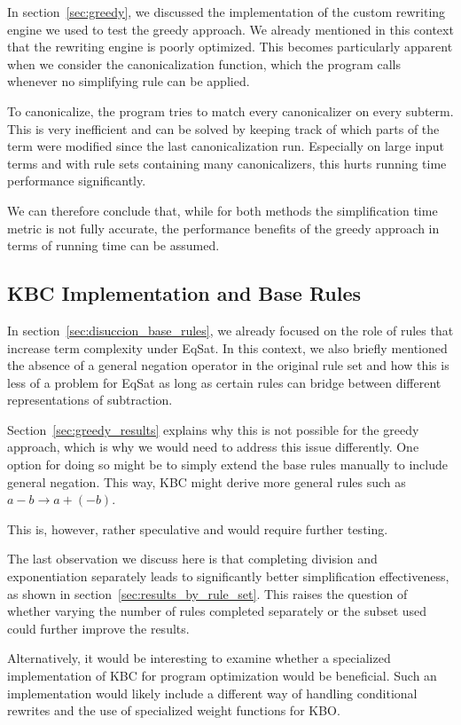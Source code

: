 In section~\ref{sec:greedy}, we discussed the implementation of the custom rewriting engine we used to test the greedy approach. We already mentioned in this context that the rewriting engine is poorly optimized. This becomes particularly apparent when we consider the canonicalization function, which the program calls whenever no simplifying rule can be applied. 

To canonicalize, the program tries to match every canonicalizer on every subterm. This is very inefficient and can be solved by keeping track of which parts of the term were modified since the last canonicalization run. Especially on large input terms and with rule sets containing many canonicalizers, this hurts running time performance significantly. 

We can therefore conclude that, while for both methods the simplification time metric is not fully accurate, the performance benefits of the greedy approach in terms of running time can be assumed. 

\subsection{KBC Implementation and Base Rules}
In section~\ref{sec:disuccion_base_rules}, we already focused on the role of rules that increase term complexity under EqSat. In this context, we also briefly mentioned the absence of a general negation operator in the original rule set and how this is less of a problem for EqSat as long as certain rules can bridge between different representations of subtraction.

Section~\ref{sec:greedy_results} explains why this is not possible for the greedy approach, which is why we would need to address this issue differently. One option for doing so might be to simply extend the base rules manually to include general negation. This way, KBC might derive more general rules such as $a - b \to a + (-b)$. 

This is, however, rather speculative and would require further testing. 

The last observation we discuss here is that completing division and exponentiation separately leads to significantly better simplification effectiveness, as shown in section~\ref{sec:results_by_rule_set}. This raises the question of whether varying the number of rules completed separately or the subset used could further improve the results.

Alternatively, it would be interesting to examine whether a specialized implementation of KBC for program optimization would be beneficial. Such an implementation would likely include a different way of handling conditional rewrites and the use of specialized weight functions for KBO. 

